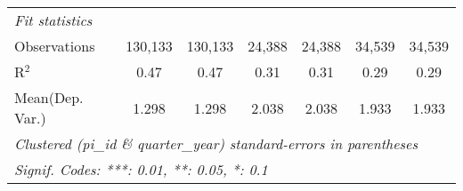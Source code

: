 \begin{tabular}{lcccccc}
   \midrule
   \emph{Fit statistics}\\
   Observations                                                & 130,133       & 130,133       & 24,388        & 24,388        & 34,539        & 34,539\\  
   R$^2$                                                       & 0.47          & 0.47          & 0.31          & 0.31          & 0.29          & 0.29\\  
Mean(Dep. Var.) & 1.298 & 1.298 & 2.038 & 2.038 & 1.933 & 1.933 \\
   \midrule \midrule
   \multicolumn{7}{l}{\emph{Clustered (pi\_id \& quarter\_year) standard-errors in parentheses}}\\
   \multicolumn{7}{l}{\emph{Signif. Codes: ***: 0.01, **: 0.05, *: 0.1}}\\
\end{tabular}
\par\endgroup
